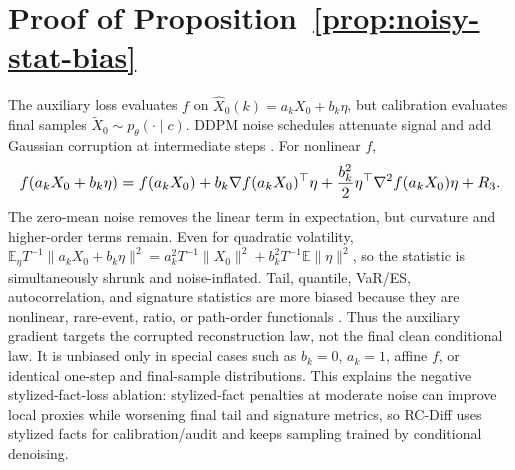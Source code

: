 \documentclass[letterpaper]{article}
\begin{document}
\section{Proof of Proposition~\ref{prop:noisy-stat-bias}}
The auxiliary loss evaluates $f$ on $\hat X_0(k)=a_kX_0+b_k\eta$, but calibration evaluates final samples $\tilde X_0\sim p_\theta(\cdot\mid c)$. DDPM noise schedules attenuate signal and add Gaussian corruption at intermediate steps \citep{ho2020ddpm,nichol2021improved}. For nonlinear $f$,
\begin{equation}
\resizebox{\linewidth}{!}{$\displaystyle
  f(a_kX_0+b_k\eta)=f(a_kX_0)+b_k\nabla f(a_kX_0)^\top\eta+\frac{b_k^2}{2}\eta^\top\nabla^2f(a_kX_0)\eta+R_3.
$}
\end{equation}
The zero-mean noise removes the linear term in expectation, but curvature and higher-order terms remain. Even for quadratic volatility, $\mathbb{E}_\eta T^{-1}\|a_kX_0+b_k\eta\|^2=a_k^2T^{-1}\|X_0\|^2+b_k^2T^{-1}\mathbb{E}\|\eta\|^2$, so the statistic is simultaneously shrunk and noise-inflated. Tail, quantile, VaR/ES, autocorrelation, and signature statistics are more biased because they are nonlinear, rare-event, ratio, or path-order functionals \citep{embrechts1997modelling,mcneil2015quantitative,kupiec1995techniques,chevyrev2016primer}. Thus the auxiliary gradient targets the corrupted reconstruction law, not the final clean conditional law. It is unbiased only in special cases such as $b_k=0$, $a_k=1$, affine $f$, or identical one-step and final-sample distributions. This explains the negative stylized-fact-loss ablation: stylized-fact penalties at moderate noise can improve local proxies while worsening final tail and signature metrics, so RC-Diff uses stylized facts for calibration/audit and keeps sampling trained by conditional denoising.
\end{document}

